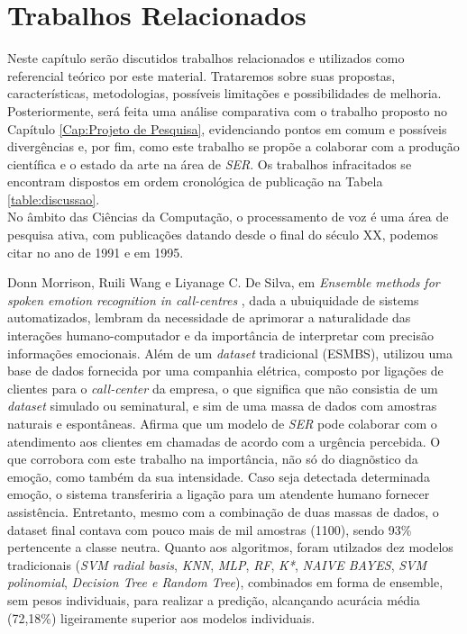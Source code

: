 \chapter{Trabalhos Relacionados}\label{Cap:Trabalhos Relacionados}

Neste capítulo serão discutidos trabalhos relacionados e utilizados como referencial teórico por este material. Trataremos sobre suas propostas, características, metodologias, possíveis limitações e possibilidades de melhoria. Posteriormente, será feita uma análise comparativa com o trabalho proposto no Capítulo \ref{Cap:Projeto de Pesquisa}, evidenciando pontos em comum e possíveis divergências e, por fim, como este trabalho se propõe a colaborar com a produção científica e o estado da arte na área de \textit{SER}. Os trabalhos infracitados se encontram dispostos em ordem cronológica de publicação na Tabela \ref{table:discussao}.\\


No âmbito das Ciências da Computação, o processamento de voz é uma área de pesquisa ativa, com publicações datando desde o final do século XX, podemos citar \cite{12.27} no ano de 1991 e \cite{12.28} em 1995.


Donn Morrison, Ruili Wang e Liyanage C. De Silva, em \textit{Ensemble methods for spoken emotion recognition in call-centres} \cite{32.32}, dada a ubuiquidade de sistems automatizados, lembram da necessidade de aprimorar a naturalidade das interações humano-computador e da importância de interpretar com precisão informações emocionais. Além de um \textit{dataset} tradicional (ESMBS), utilizou uma base de dados fornecida por uma companhia elétrica, composto por ligações de clientes para o \textit{call-center} da empresa, o que significa que não consistia de um \textit{dataset} simulado ou seminatural, e sim de uma massa de dados com amostras naturais e espontâneas. Afirma que um modelo de \textit{SER} pode colaborar com o atendimento aos clientes em chamadas de acordo com a urgência percebida. O que corrobora com este trabalho na importância, não só do diagnõstico da emoção, como também da sua intensidade. Caso seja detectada determinada emoção, o sistema transferiria a ligação para um atendente humano fornecer assistência. Entretanto, mesmo com a combinação de duas massas de dados, o dataset final contava com pouco mais de mil amostras (1100), sendo 93\% pertencente a classe neutra. Quanto aos algoritmos, foram utilzados dez modelos tradicionais (\textit{SVM radial basis}, \textit{KNN}, \textit{MLP}, \textit{RF}, \textit{K*}, \textit{NAIVE BAYES}, \textit{SVM polinomial}, \textit{Decision Tree e Random Tree}), combinados em forma de ensemble, sem pesos individuais, para realizar a predição, alcançando acurácia média (72,18\%) ligeiramente superior aos modelos individuais.


